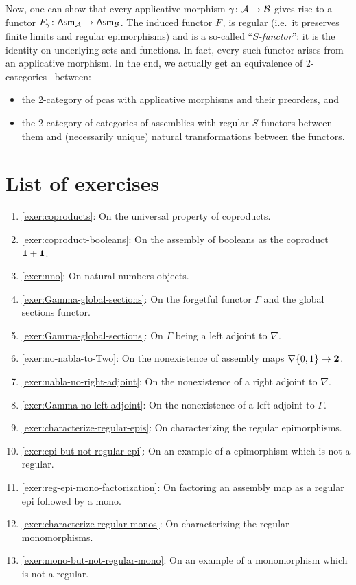 Now, one can show that every applicative morphism \(\gamma \colon \mathcal A \to \mathcal B\)
gives rise to a functor \(F_\gamma \colon \mathsf{Asm}_{\mathcal A} \to \mathsf{Asm}_{\mathcal B}\).
%
The induced functor \(F_\gamma\) is regular (i.e.\ it preserves finite limits
and regular epimorphisms) and is a so-called ``\emph{\(S\)-functor}'': it is the
identity on underlying sets and functions.
%
In fact, every such functor arises from an applicative morphism.
%
In the end, we actually get an equivalence of
2-categories~\cite[Theorem~1.6.2]{vanOosten2008} between:
\begin{itemize}
\item the 2-category of pcas with applicative morphisms and their preorders, and
\item the 2-category of categories of assemblies with regular \(S\)-functors between
  them and (necessarily unique) natural transformations between the functors.
\end{itemize}




\section{List of exercises}
\begin{enumerate}
\item \cref{exer:coproducts}: On the universal property of coproducts.
\item \cref{exer:coproduct-booleans}: On the assembly of booleans as the
  coproduct \(\mathbf 1 + \mathbf 1\).
\item \cref{exer:nno}: On natural numbers objects.
\item \cref{exer:Gamma-global-sections}: On the forgetful functor \(\Gamma\) and
  the global sections functor.
\item \cref{exer:Gamma-global-sections}: On \(\Gamma\) being a left adjoint to
  \(\nabla\).
\item \cref{exer:no-nabla-to-Two}: On the nonexistence of assembly maps
  \(\nabla\{0,1\} \to \mathbf 2\).
\item \cref{exer:nabla-no-right-adjoint}: On the nonexistence of a right
  adjoint to \(\nabla\).
\item \cref{exer:Gamma-no-left-adjoint}: On the nonexistence of a left
  adjoint to \(\Gamma\).
\item \cref{exer:characterize-regular-epis}: On characterizing the regular
  epimorphisms.
\item \cref{exer:epi-but-not-regular-epi}: On an example of a epimorphism
  which is not a regular.
\item \cref{exer:reg-epi-mono-factorization}: On factoring an assembly map as a
  regular epi followed by a mono.
\item \cref{exer:characterize-regular-monos}: On characterizing the regular
  monomorphisms.
\item \cref{exer:mono-but-not-regular-mono}: On an example of a monomorphism
  which is not a regular.
\end{enumerate}

